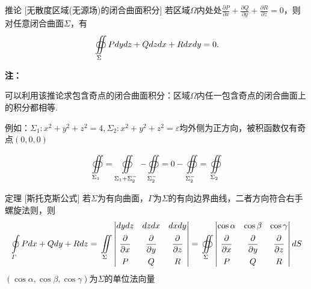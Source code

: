 \documentclass[a4paper,12pt,oneside,fontset=none]{ctexbook}
\let\olddfrac\dfrac
\renewcommand{\dfrac}[2]{
    \olddfrac{#1\vrule width 0pt height 1.15em depth 0em}{#2\vrule width 0pt height 0em depth 0.6em}
}
\let\oldiint\iint
\renewcommand{\iint}{\displaystyle{\vrule width 0pt height 0em depth 0em}\oldiint}
\let\oldoint\oint
\renewcommand{\oint}{\displaystyle{\vrule width 0pt height 1.5em depth 1.5em}\oldoint}
\let\oldoiint\oiint
\renewcommand{\oiint}{\displaystyle{\vrule width 0pt height 1.5em depth 1.5em}\oldoiint}
\newcounter{theorem}[chapter]
\newenvironment{theorem}[1][]{\begin{thmBox}{定理}{#1}}{\end{thmBox}}
\newenvironment{corollary}[1][]{\begin{thmBox}{推论}{#1}}{\end{thmBox}}
\newenvironment{note}{
    \par\vspace{0.5em}\noindent
    \textbf{\color{NoteColor} 注：}
}{
    \par\vspace{0.5em}
}
\numberwithin{equation}{chapter}
\begin{document}
\begin{corollary}
    [无散度区域(无源场)的闭合曲面积分]
    若区域$\Omega$内处处$\frac{\partial P}{\partial x} + \frac{\partial Q}{\partial y} + \frac{\partial R}{\partial z} = 0$，则对任意闭合曲面$\Sigma$，有
$$\oiint\limits_{\Sigma} Pdy dz + Qdz dx + Rdx dy = 0.$$
\end{corollary}
\begin{note}
    可以利用该推论求包含奇点的闭合曲面积分：区域$\Omega$内任一包含奇点的闭合曲面上的积分都相等.

    例如：$\Sigma_1: x^2 + y^2 + z^2 = 4, \Sigma_2: x^2 + y^2 + z^2 = \varepsilon $均外侧为正方向，被积函数仅有奇点$(0,0,0)$

    $$\oiint\limits_{\Sigma_1} = \oiint\limits_{\Sigma_1 + \Sigma_2^-} - \oiint\limits_{\Sigma_2^-} = 0 - \oiint\limits_{\Sigma_2^-} = \oiint\limits_{\Sigma_2}$$
\end{note}

\begin{theorem}
    [斯托克斯公式]
    若$\Sigma$为有向曲面，$\varGamma$为$\Sigma$的有向边界曲线，二者方向符合右手螺旋法则，则
    $$   
    \oint\limits_{\varGamma} Pdx + Qdy + Rdz = \iint\limits_{\Sigma}
    \begin{vmatrix}
        dydz & dzdx & dxdy\\
        \dfrac{\partial}{\partial x} & \dfrac{\partial}{\partial y} & \dfrac{\partial}{\partial z}\\
        P & Q & R
    \end{vmatrix}
    = \oiint\limits_{\Sigma} \begin{vmatrix}
        \cos \alpha & \cos \beta & \cos \gamma\\
        \dfrac{\partial}{\partial x} & \dfrac{\partial}{\partial y} & \dfrac{\partial}{\partial z}\\
        P & Q & R
    \end{vmatrix}dS
    $$
    $(\cos \alpha, \cos \beta, \cos \gamma)$为$\Sigma$的单位法向量
\end{theorem}
\end{document}
